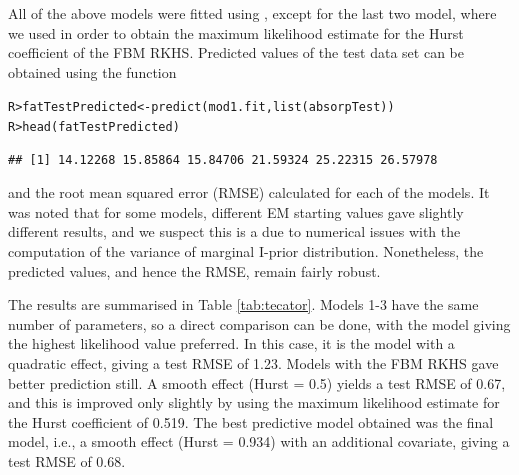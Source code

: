 \documentclass[a4paper,showframe,11pt]{report}\usepackage[]{graphicx}\usepackage[]{color}
\makeatletter
\newcommand{\hlstd}[1]{\textcolor[rgb]{0.196,0.196,0.196}{#1}}%
\newcommand{\hlkwb}[1]{\textcolor[rgb]{0.627,0,0.314}{#1}}%
\newcommand{\hlkwd}[1]{\textcolor[rgb]{0.78,0.227,0.412}{#1}}%
\newenvironment{kframe}{%
 \def\at@end@of@kframe{}%
 \ifinner\ifhmode%
  \def\at@end@of@kframe{\end{minipage}}%
  \begin{minipage}{\columnwidth}%
 \fi\fi%
 \def\FrameCommand##1{\hskip\@totalleftmargin \hskip-\fboxsep
 \colorbox{shadecolor}{##1}\hskip-\fboxsep
     \hskip-\linewidth \hskip-\@totalleftmargin \hskip\columnwidth}%
 \MakeFramed {\advance\hsize-\width
   \@totalleftmargin\z@ \linewidth\hsize
   \@setminipage}}%
 {\par\unskip\endMakeFramed%
 \at@end@of@kframe}
\newenvironment{knitrout}{}{} %
\makeatother
\begin{document}
All of the above models were fitted using , except for the last two model, where we used  in order to obtain the maximum likelihood estimate for the Hurst coefficient of the FBM RKHS. Predicted values of the test data set can be obtained using the  function

\begin{knitrout}
\color{fgcolor}\begin{kframe}
\begin{alltt}
\hlstd{R> }\hlstd{fatTestPredicted} \hlkwb{<-} \hlkwd{predict}\hlstd{(mod1.fit,} \hlkwd{list}\hlstd{(absorpTest))}
\hlstd{R> }\hlkwd{head}\hlstd{(fatTestPredicted)}
\end{alltt}
\begin{verbatim}
## [1] 14.12268 15.85864 15.84706 21.59324 25.22315 26.57978
\end{verbatim}
\end{kframe}
\end{knitrout}

and the root mean squared error (RMSE) calculated for each of the models. It was noted that for some models, different EM starting values gave slightly different results, and we suspect this is a due to numerical issues with the computation of the variance of marginal I-prior distribution. Nonetheless, the predicted values, and hence the RMSE, remain fairly robust.

The results are summarised in Table \ref{tab:tecator}. Models 1-3 have the same number of parameters, so a direct comparison can be done, with the model giving the highest likelihood value preferred. In this case, it is the model with a quadratic effect, giving a test RMSE of 1.23. Models with the FBM RKHS gave better prediction still. A smooth effect (Hurst = 0.5) yields a test RMSE of 0.67, and this is improved only slightly by using the maximum likelihood estimate for the Hurst coefficient of 0.519. The best predictive model obtained was the final model, i.e., a smooth effect (Hurst = 0.934) with an additional covariate, giving a test RMSE of 0.68.
\end{document}

